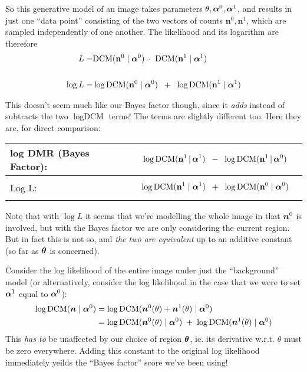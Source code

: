 \documentclass[12pt]{article}
\newcommand{\given}{\,|\,}
\renewcommand{\vec}[1]{\mathbf{#1}}
\newcommand{\balpha}{\mbox{\boldmath $\alpha$}}
\newcommand{\btheta}{\mbox{\boldmath $\theta$}}
\newcommand{\bn}{\mbox{\boldmath $n$}}
\newcommand{\DCM}{\mbox{DCM}}
\begin{document}
So this generative model of an image takes parameters $\theta,
\balpha^0, \balpha^1$, and results in just one ``data point''
consisting of the two vectors of counts $\vec{n}^0,\vec{n}^1$, which are sampled independently of one another.  The
likelihood and its logarithm are therefore
\begin{align*}
L =& \DCM(\vec{n}^0 \mid \balpha^0) \; \cdot \; \DCM(\vec{n}^1 \mid \balpha^1) 
\\ \\
\log L =& \log \DCM(\vec{n}^0 \mid \balpha^0) \;\; + \;\; \log \DCM(\vec{n}^1 \mid \balpha^1) 
\end{align*}

This doesn't seem much like our Bayes factor though, since it
\emph{adds} instead of subtracts the two $\log \DCM$ terms! The terms
are slightly different too.  Here they are, for direct comparison:

\begin{tabular}{|l|l|}
\hline
log DMR (Bayes Factor): & 
\parbox{.7\textwidth}{
\begin{align*}
&\log \DCM(\vec{n}^1 \given \balpha^1) \;\;-\;\; \log \DCM(\vec{n}^1 \given \balpha^0)
\end{align*}
} \\
\hline
Log L: & 
\parbox{.7\textwidth}{
\begin{align*}
& \log \DCM(\vec{n}^1 \mid \balpha^1) \;\; + \;\; \log \DCM(\vec{n}^0 \mid \balpha^0)
\end{align*}
} \\
\hline
\end{tabular}

Note that with $\log L$ it seems that we're modelling the whole image
in that $\bn^0$ is involved, but with the Bayes factor we are only
considering the current region. But in fact this is not so, and {\it
  the two are equivalent} up to an additive constant (so far as
$\btheta$ is concerned).

Consider the log likelihood of the entire image under just the
``background'' model (or alternatively, consider the log likelihood in the case that we were to set $\balpha^1$ equal to $\balpha^0$):
\begin{align*}
\log \DCM(\bn \mid \balpha^0) 
&= \log \DCM(\bn^0(\theta) + \bn^1(\theta) \mid \balpha^0)  \\
&= \log \DCM(\bn^0(\theta) \mid \balpha^0) \; + \; \log \DCM(\bn^1(\theta) \mid \balpha^0) 
\end{align*}
This \emph{has to} be unaffected by our choice of region $\btheta$,
ie. its derivative w.r.t. $\theta$ must be zero everywhere.  Adding
this constant to the original log likelihood immediately yeilds the
``Bayes factor'' score we've been using!
\end{document}
